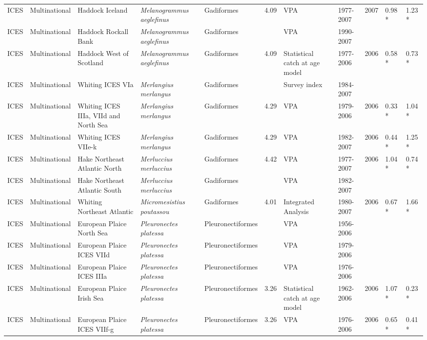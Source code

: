 \begin{longtable}{p{1.5cm}p{1.5cm}p{3cm}p{3cm}p{2.5cm}p{0.9cm}p{1.4cm}p{0.9cm}p{0.9cm}p{0.9cm}p{1cm}}
  ICES & Multinational & Haddock Iceland & \textit{Melanogrammus aeglefinus} & Gadiformes & 4.09 & VPA & 1977-2007 & 2007 & 0.98 * & 1.23 * \\ 
  ICES & Multinational & Haddock Rockall Bank & \textit{Melanogrammus aeglefinus} & Gadiformes &  & VPA & 1990-2007 &  &  &  \\ 
  ICES & Multinational & Haddock West of Scotland & \textit{Melanogrammus aeglefinus} & Gadiformes & 4.09 & Statistical catch at age model & 1977-2006 & 2006 & 0.58 * & 0.73 * \\ 
  ICES & Multinational & Whiting ICES VIa & \textit{Merlangius merlangus} & Gadiformes &  & Survey index & 1984-2007 &  &  &  \\ 
  ICES & Multinational & Whiting ICES IIIa, VIId and North Sea & \textit{Merlangius merlangus} & Gadiformes & 4.29 & VPA & 1979-2006 & 2006 & 0.33 * & 1.04 * \\ 
  ICES & Multinational & Whiting ICES VIIe-k & \textit{Merlangius merlangus} & Gadiformes & 4.29 & VPA & 1982-2007 & 2006 & 0.44 * & 1.25 * \\ 
  ICES & Multinational & Hake Northeast Atlantic North & \textit{Merluccius merluccius} & Gadiformes & 4.42 & VPA & 1977-2007 & 2006 & 1.04 * & 0.74 * \\ 
  ICES & Multinational & Hake Northeast Atlantic South & \textit{Merluccius merluccius} & Gadiformes &  & VPA & 1982-2007 &  &  &  \\ 
  ICES & Multinational & Whiting Northeast Atlantic & \textit{Micromesistius poutassou} & Gadiformes & 4.01 & Integrated Analysis & 1980-2007 & 2006 & 0.67 * & 1.66 * \\ 
  ICES & Multinational & European Plaice North Sea & \textit{Pleuronectes platessa} & Pleuronectiformes &  & VPA & 1956-2006 &  &  &  \\ 
  ICES & Multinational & European Plaice ICES VIId & \textit{Pleuronectes platessa} & Pleuronectiformes &  & VPA & 1979-2006 &  &  &  \\ 
  ICES & Multinational & European Plaice ICES IIIa & \textit{Pleuronectes platessa} & Pleuronectiformes &  & VPA & 1976-2006 &  &  &  \\ 
  ICES & Multinational & European Plaice Irish Sea & \textit{Pleuronectes platessa} & Pleuronectiformes & 3.26 & Statistical catch at age model & 1962-2006 & 2006 & 1.07 * & 0.23 * \\ 
  ICES & Multinational & European Plaice ICES VIIf-g & \textit{Pleuronectes platessa} & Pleuronectiformes & 3.26 & VPA & 1976-2006 & 2006 & 0.65 * & 0.41 * \\ 

\end{longtable}
